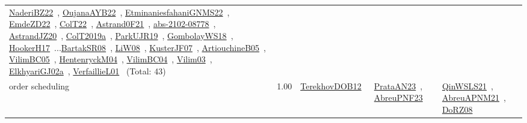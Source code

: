 {\begin{longtable}{p{3cm}r>{\raggedright\arraybackslash}p{6cm}>{\raggedright\arraybackslash}p{6cm}>{\raggedright\arraybackslash}p{8cm}}
\href{../works/NaderiBZ22.pdf}{NaderiBZ22}~\cite{NaderiBZ22}, \href{../works/OujanaAYB22.pdf}{OujanaAYB22}~\cite{OujanaAYB22}, \href{../works/EtminaniesfahaniGNMS22.pdf}{EtminaniesfahaniGNMS22}~\cite{EtminaniesfahaniGNMS22}, \href{../works/EmdeZD22.pdf}{EmdeZD22}~\cite{EmdeZD22}, \href{../works/ColT22.pdf}{ColT22}~\cite{ColT22}, \href{../works/Astrand0F21.pdf}{Astrand0F21}~\cite{Astrand0F21}, \href{../works/abs-2102-08778.pdf}{abs-2102-08778}~\cite{abs-2102-08778}, \href{../works/AstrandJZ20.pdf}{AstrandJZ20}~\cite{AstrandJZ20}, \href{../works/ColT2019a.pdf}{ColT2019a}~\cite{ColT2019a}, \href{../works/ParkUJR19.pdf}{ParkUJR19}~\cite{ParkUJR19}, \href{../works/GombolayWS18.pdf}{GombolayWS18}~\cite{GombolayWS18}, \href{../works/HookerH17.pdf}{HookerH17}~\cite{HookerH17}...\href{../works/BartakSR08.pdf}{BartakSR08}~\cite{BartakSR08}, \href{../works/LiW08.pdf}{LiW08}~\cite{LiW08}, \href{../works/KusterJF07.pdf}{KusterJF07}~\cite{KusterJF07}, \href{../works/ArtiouchineB05.pdf}{ArtiouchineB05}~\cite{ArtiouchineB05}, \href{../works/VilimBC05.pdf}{VilimBC05}~\cite{VilimBC05}, \href{../works/HentenryckM04.pdf}{HentenryckM04}~\cite{HentenryckM04}, \href{../works/VilimBC04.pdf}{VilimBC04}~\cite{VilimBC04}, \href{../works/Vilim03.pdf}{Vilim03}~\cite{Vilim03}, \href{../works/ElkhyariGJ02a.pdf}{ElkhyariGJ02a}~\cite{ElkhyariGJ02a}, \href{../works/VerfaillieL01.pdf}{VerfaillieL01}~\cite{VerfaillieL01} (Total: 43)\\
\index{order scheduling}\index{Concepts!order scheduling}order scheduling &  1.00 & \href{../works/TerekhovDOB12.pdf}{TerekhovDOB12}~\cite{TerekhovDOB12} & \href{../works/PrataAN23.pdf}{PrataAN23}~\cite{PrataAN23}, \href{../works/AbreuPNF23.pdf}{AbreuPNF23}~\cite{AbreuPNF23} & \href{../works/QinWSLS21.pdf}{QinWSLS21}~\cite{QinWSLS21}, \href{../works/AbreuAPNM21.pdf}{AbreuAPNM21}~\cite{AbreuAPNM21}, \href{../works/DoRZ08.pdf}{DoRZ08}~\cite{DoRZ08}\\

\end{longtable}}
